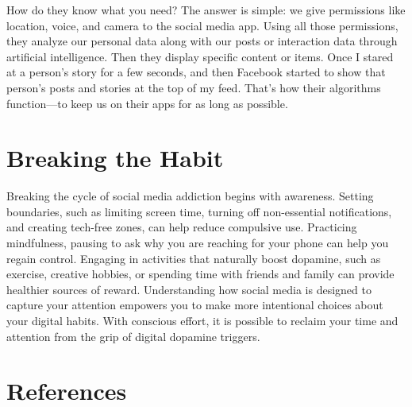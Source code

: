 \documentclass[a4paper,10pt,twocolumn]{memoir}
\begin{document}
{{{{{{How do they know what you need? The answer is simple: we give permissions like location, voice, and camera to the social media app. Using all those permissions, they analyze our personal data along with our posts or interaction data through artificial intelligence. Then they display specific content or items. Once I stared at a person’s story for a few seconds, and then Facebook started to show that person’s posts and stories at the top of my feed. That’s how their algorithms function—to keep us on their apps for as long as possible.

\section*{Breaking the Habit}

Breaking the cycle of social media addiction begins with awareness. Setting boundaries, such as limiting screen time, turning off non-essential notifications, and creating tech-free zones, can help reduce compulsive use. Practicing mindfulness, pausing to ask why you are reaching for your phone can help you regain control. Engaging in activities that naturally boost dopamine, such as exercise, creative hobbies, or spending time with friends and family can provide healthier sources of reward. Understanding how social media is designed to capture your attention empowers you to make more intentional choices about your digital habits. With conscious effort, it is possible to reclaim your time and attention from the grip of digital dopamine triggers.

\section*{References}

}}}}}}
\end{document}
